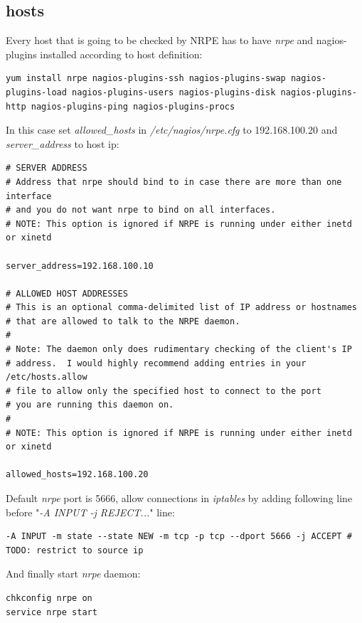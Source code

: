 \documentclass[10pt,a4paper,final]{report}
\begin{document}
\subsection{hosts}
Every host that is going to be checked by NRPE has to have \emph{nrpe} and nagios-plugins installed according to host definition:
\begin{lstlisting}
yum install nrpe nagios-plugins-ssh nagios-plugins-swap nagios-plugins-load nagios-plugins-users nagios-plugins-disk nagios-plugins-http nagios-plugins-ping nagios-plugins-procs
\end{lstlisting}
In this case set \emph{allowed\_hosts} in \emph{/etc/nagios/nrpe.cfg} to 192.168.100.20 and \emph{server\_address} to host ip:
\begin{lstlisting}
# SERVER ADDRESS
# Address that nrpe should bind to in case there are more than one interface
# and you do not want nrpe to bind on all interfaces.
# NOTE: This option is ignored if NRPE is running under either inetd or xinetd

server_address=192.168.100.10

# ALLOWED HOST ADDRESSES
# This is an optional comma-delimited list of IP address or hostnames 
# that are allowed to talk to the NRPE daemon.
#
# Note: The daemon only does rudimentary checking of the client's IP
# address.  I would highly recommend adding entries in your /etc/hosts.allow
# file to allow only the specified host to connect to the port
# you are running this daemon on.
#
# NOTE: This option is ignored if NRPE is running under either inetd or xinetd

allowed_hosts=192.168.100.20
\end{lstlisting}
Default \emph{nrpe} port is 5666, allow connections in \emph{iptables} by adding following line before "\emph{-A INPUT -j REJECT...}" line:
\begin{lstlisting}
-A INPUT -m state --state NEW -m tcp -p tcp --dport 5666 -j ACCEPT # TODO: restrict to source ip
\end{lstlisting}
And finally start \emph{nrpe} daemon:
\begin{lstlisting}
chkconfig nrpe on
service nrpe start
\end{lstlisting}
\end{document}
